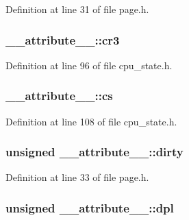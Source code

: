 \-Definition at line 31 of file page.\-h.

\hypertarget{struct____attribute_____aad1111fc24007eda46d553857bbe0524}{
\subsubsection[{cr3}]{ {\bf \-\_\-\-\_\-attribute\-\_\-\-\_\-\-::cr3}}}\label{struct____attribute_____aad1111fc24007eda46d553857bbe0524}


\-Definition at line 96 of file cpu\-\_\-state.\-h.

\hypertarget{struct____attribute_____a0682565c0928a4da6b436d4542d2a17c}{
\subsubsection[{cs}]{ {\bf \-\_\-\-\_\-attribute\-\_\-\-\_\-\-::cs}}}\label{struct____attribute_____a0682565c0928a4da6b436d4542d2a17c}


\-Definition at line 108 of file cpu\-\_\-state.\-h.

\hypertarget{struct____attribute_____a684719632df533b51256f379d081cf72}{
\subsubsection[{dirty}]{\setlength{\rightskip}{0pt plus 5cm}unsigned {\bf \-\_\-\-\_\-attribute\-\_\-\-\_\-\-::dirty}}}\label{struct____attribute_____a684719632df533b51256f379d081cf72}


\-Definition at line 33 of file page.\-h.

\hypertarget{struct____attribute_____ae146dc9cb9997c03d09dfab13c32e710}{
\subsubsection[{dpl}]{\setlength{\rightskip}{0pt plus 5cm}unsigned {\bf \-\_\-\-\_\-attribute\-\_\-\-\_\-\-::dpl}}}\label{struct____attribute_____ae146dc9cb9997c03d09dfab13c32e710}


